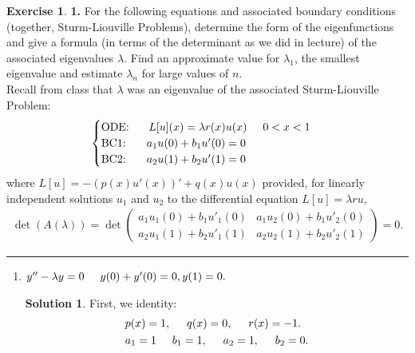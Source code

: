 \documentclass{article}
\theoremstyle{definition}
\newtheorem*{exer*}{Exercise}
\newtheorem*{sln*}{Solution}
\begin{document}
\begin{exer*}\textbf{1.}
	For the following equations and associated boundary conditions (together, Sturm-Liouville Problems),
	determine the form of the eigenfunctions and give a formula (in terms of the determinant as we did in lecture) of
	the associated eigenvalues $\lambda$. Find an approximate value for $\lambda_1$, the smallest eigenvalue and estimate $\lambda_n$ for large
	values of $n$.\\
	
	Recall from class that $\lambda$ was an eigenvalue of the associated Sturm-Liouville Problem:
	\begin{align*}
	\begin{cases}
	\text{ODE: }\hspace{0.5cm} L[u](x) = \lambda r(x)u(x)\hspace{0.5cm} 0<x<1\\
	\text{BC1: }\hspace{0.5cm} a_1u(0) + b_1 u'(0) = 0\\
	\text{BC2: }\hspace{0.5cm} a_2u(1) + b_2u'(1) = 0
	\end{cases}
	\end{align*}
	where $L[u] = -(p(x)u'(x))' + q(x)u(x)$ provided, for linearly independent solutions $u_1$ and $u_2$ to the differential
	equation $L[u] = \lambda ru$,
	\begin{align*}
	\det(A(\lambda)) = \det\begin{pmatrix}
	a_1u_1(0) + b_1 u'_1(0) & a_1u_2(0) + b_1 u'_2(0)\\
	a_2u_1(1) + b_2 u'_1(1) & a_2u_2(1) + b_2 u'_2(1)
	\end{pmatrix} = 0.
	\end{align*}
	
	\noindent\rule{\textwidth}{0.5pt}
	\begin{enumerate}
		\item $y'' - \lambda y = 0\hspace{0.5cm} y(0) + y'(0) = 0, y(1) = 0.$\\
		
		\begin{sln*}
			First, we identity:
			\begin{align*}
			&p(x) = 1,\hspace{0.5cm} q(x) = 0,\hspace{0.5cm} r(x) = -1.\\
			&a_1 = 1\hspace{0.5cm} b_1 = 1,\hspace{0.5cm}a_2 = 1,\hspace{0.5cm} b_2 = 0.
			\end{align*}
			

\end{sln*}
\end{enumerate}
\end{exer*}
\end{document}
